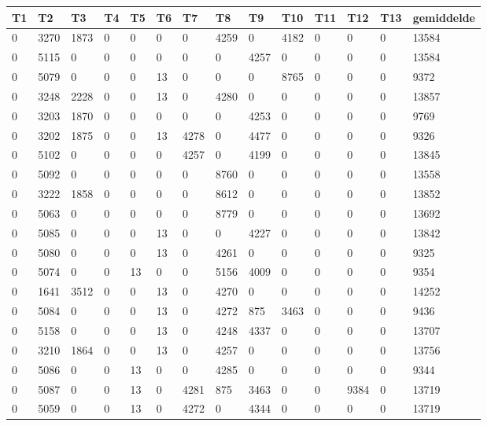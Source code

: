 \begin{longtable}{ | l | l | l | l | l | l | l | l | l | l | l | l | l || l | }
\hline
	T1 & T2 & T3 & T4 & T5 & T6 & T7 & T8 & T9 & T10 & T11 & T12 & T13 & gemiddelde \\ \hline
	0 & 3270 & 1873 & 0 & 0 & 0 & 0 & 4259 & 0 & 4182 & 0 & 0 & 0 & 13584 \\ \hline
	0 & 5115 & 0 & 0 & 0 & 0 & 0 & 0 & 4257 & 0 & 0 & 0 & 0 & 13584 \\ \hline
	0 & 5079 & 0 & 0 & 0 & 13 & 0 & 0 & 0 & 8765 & 0 & 0 & 0 & 9372 \\ \hline
	0 & 3248 & 2228 & 0 & 0 & 13 & 0 & 4280 & 0 & 0 & 0 & 0 & 0 & 13857 \\ \hline
	0 & 3203 & 1870 & 0 & 0 & 0 & 0 & 0 & 4253 & 0 & 0 & 0 & 0 & 9769 \\ \hline
	0 & 3202 & 1875 & 0 & 0 & 13 & 4278 & 0 & 4477 & 0 & 0 & 0 & 0 & 9326 \\ \hline
	0 & 5102 & 0 & 0 & 0 & 0 & 4257 & 0 & 4199 & 0 & 0 & 0 & 0 & 13845 \\ \hline
	0 & 5092 & 0 & 0 & 0 & 0 & 0 & 8760 & 0 & 0 & 0 & 0 & 0 & 13558 \\ \hline
	0 & 3222 & 1858 & 0 & 0 & 0 & 0 & 8612 & 0 & 0 & 0 & 0 & 0 & 13852 \\ \hline
	0 & 5063 & 0 & 0 & 0 & 0 & 0 & 8779 & 0 & 0 & 0 & 0 & 0 & 13692 \\ \hline
	0 & 5085 & 0 & 0 & 0 & 13 & 0 & 0 & 4227 & 0 & 0 & 0 & 0 & 13842 \\ \hline
	0 & 5080 & 0 & 0 & 0 & 13 & 0 & 4261 & 0 & 0 & 0 & 0 & 0 & 9325 \\ \hline
	0 & 5074 & 0 & 0 & 13 & 0 & 0 & 5156 & 4009 & 0 & 0 & 0 & 0 & 9354 \\ \hline
	0 & 1641 & 3512 & 0 & 0 & 13 & 0 & 4270 & 0 & 0 & 0 & 0 & 0 & 14252 \\ \hline
	0 & 5084 & 0 & 0 & 0 & 13 & 0 & 4272 & 875 & 3463 & 0 & 0 & 0 & 9436 \\ \hline
	0 & 5158 & 0 & 0 & 0 & 13 & 0 & 4248 & 4337 & 0 & 0 & 0 & 0 & 13707 \\ \hline
	0 & 3210 & 1864 & 0 & 0 & 13 & 0 & 4257 & 0 & 0 & 0 & 0 & 0 & 13756 \\ \hline
	0 & 5086 & 0 & 0 & 13 & 0 & 0 & 4285 & 0 & 0 & 0 & 0 & 0 & 9344 \\ \hline
	0 & 5087 & 0 & 0 & 13 & 0 & 4281 & 875 & 3463 & 0 & 0 & 9384 & 0 & 13719\\ \hline	
	0 & 5059 & 0 & 0 & 13 & 0 & 4272 & 0 & 4344 & 0 & 0 & 0 & 0 & 13719 \\ \hline

\end{longtable}
